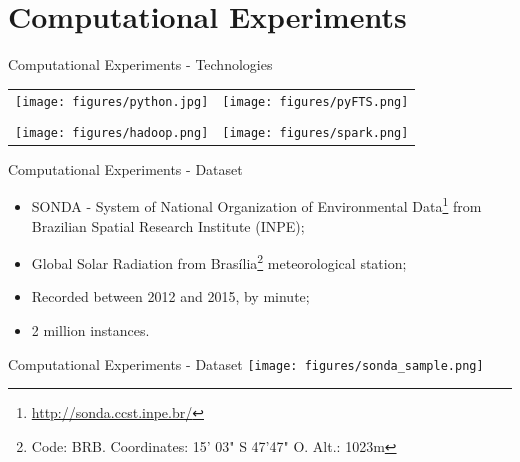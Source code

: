 \documentclass{beamer}
\begin{document}
\section{Computational Experiments}

\begin{frame}{Computational Experiments - Technologies}
\begin{center}
    \begin{tabular}{cc}
        \texttt{[image: figures/python.jpg]} 
        &
        \texttt{[image: figures/pyFTS.png]}
        \\
        &
        \\
        \texttt{[image: figures/hadoop.png]}
         & 
         \texttt{[image: figures/spark.png]}
    \end{tabular}
\end{center}
\end{frame}

\begin{frame}{Computational Experiments - Dataset}
\linespread{1.5}
\begin{itemize}
\item SONDA - System of National Organization of Environmental Data\footnote{\url{http://sonda.ccst.inpe.br/}} from Brazilian Spatial Research Institute (INPE);
\item Global Solar Radiation from Brasília\footnote{Code: BRB. Coordinates: 15' 03" S 47'47" O. Alt.: 1023m} meteorological station;
\item Recorded between 2012 and 2015, by minute;
\item 2 million instances.
\end{itemize}
\end{frame}

\begin{frame}{Computational Experiments - Dataset}
\centering
\texttt{[image: figures/sonda\_sample.png]}
\end{frame}
\end{document}
